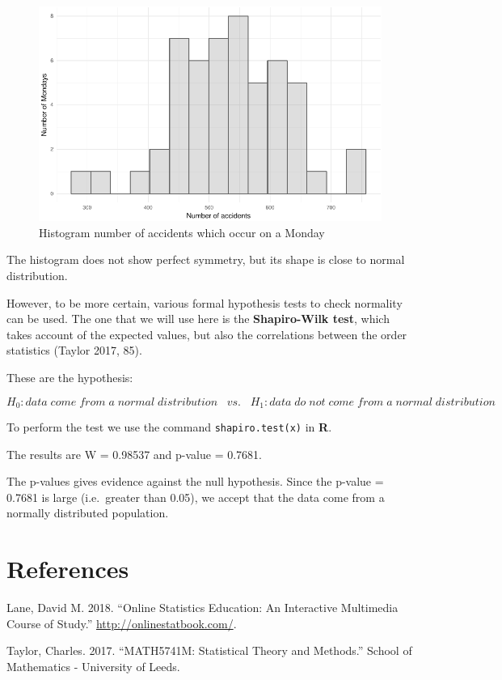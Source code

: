 \documentclass[]{article}
\begin{document}
\begin{figure}[H]

{\centering \includegraphics{README_files/figure-latex/fig5-1} 

}

\caption{Histogram number of accidents which occur on a Monday}\label{fig:fig5}
\end{figure}

The histogram does not show perfect symmetry, but its shape is close to
normal distribution.

However, to be more certain, various formal hypothesis tests to check
normality can be used. The one that we will use here is the
\textbf{Shapiro-Wilk test}, which takes account of the expected values,
but also the correlations between the order statistics (Taylor 2017,
85).

These are the hypothesis:

\[H_{0}: data\;come\;from\;a\;normal\;distribution\;\;\;vs.\;\;\;H_{1}:data\;do\;not\;come\;from\;a\;normal\;distribution\]

To perform the test we use the command \texttt{shapiro.test(x)} in
\textbf{R}.

The results are W = 0.98537 and p-value = 0.7681.

The p-values gives evidence against the null hypothesis. Since the
p-value = 0.7681 is large (i.e.~greater than 0.05), we accept that the
data come from a normally distributed population.

\section*{References}\label{references}

\hypertarget{refs}{}
\hypertarget{ref-lane_online_2018}{}
Lane, David M. 2018. ``Online Statistics Education: An Interactive
Multimedia Course of Study.'' \url{http://onlinestatbook.com/}.

\hypertarget{ref-taylor_math5741m:_2017}{}
Taylor, Charles. 2017. ``MATH5741M: Statistical Theory and Methods.''
School of Mathematics - University of Leeds.
\end{document}
